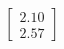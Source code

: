 \documentclass[preview]{standalone}
\begin{document}
\begin{align*}
\begin{bmatrix} 2.10 \\ 2.57 \end{bmatrix}
\end{align*}
\end{document}
